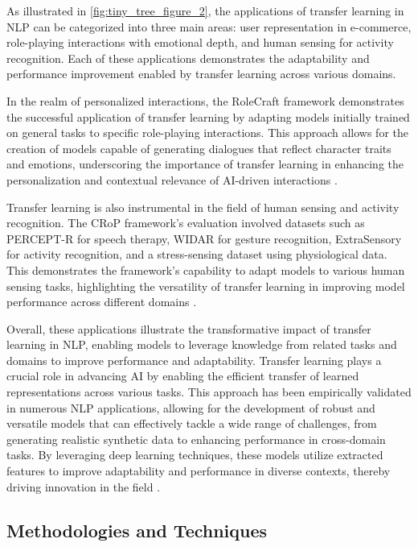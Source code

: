 As illustrated in \autoref{fig:tiny_tree_figure_2}, the applications of transfer learning in NLP can be categorized into three main areas: user representation in e-commerce, role-playing interactions with emotional depth, and human sensing for activity recognition. Each of these applications demonstrates the adaptability and performance improvement enabled by transfer learning across various domains.

In the realm of personalized interactions, the RoleCraft framework demonstrates the successful application of transfer learning by adapting models initially trained on general tasks to specific role-playing interactions. This approach allows for the creation of models capable of generating dialogues that reflect character traits and emotions, underscoring the importance of transfer learning in enhancing the personalization and contextual relevance of AI-driven interactions \cite{tao2024rolecraftglmadvancingpersonalizedroleplaying}.

Transfer learning is also instrumental in the field of human sensing and activity recognition. The CRoP framework's evaluation involved datasets such as PERCEPT-R for speech therapy, WIDAR for gesture recognition, ExtraSensory for activity recognition, and a stress-sensing dataset using physiological data. This demonstrates the framework's capability to adapt models to various human sensing tasks, highlighting the versatility of transfer learning in improving model performance across different domains \cite{kaur2024cropcontextwiserobuststatic}.

Overall, these applications illustrate the transformative impact of transfer learning in NLP, enabling models to leverage knowledge from related tasks and domains to improve performance and adaptability. Transfer learning plays a crucial role in advancing AI by enabling the efficient transfer of learned representations across various tasks. This approach has been empirically validated in numerous NLP applications, allowing for the development of robust and versatile models that can effectively tackle a wide range of challenges, from generating realistic synthetic data to enhancing performance in cross-domain tasks. By leveraging deep learning techniques, these models utilize extracted features to improve adaptability and performance in diverse contexts, thereby driving innovation in the field \cite{pihlgren2024systematicperformanceanalysisdeep,kasneci2023chatgpt}.


\subsection{Methodologies and Techniques} \label{subsec:Methodologies and Techniques}



